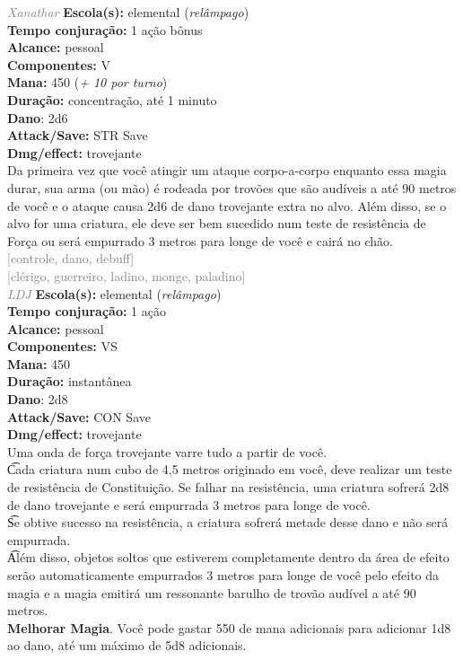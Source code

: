 \documentclass{RPG_Adventure}[2021/10/20]
\begin{document}
{\tiny \textcolor{gray}{\textit{Xanathar}}}
{\small \t \textbf{Escola(s):} elemental (\textit{relâmpago})\\\t \textbf{Tempo conjuração:} 1 ação bônus\\\t \textbf{Alcance:} pessoal\\\t \textbf{Componentes:} V\\\t \textbf{Mana:} 450 (\textit{+ 10 por turno})\\\t \textbf{Duração:} concentração, até 1 minuto\\\t \textbf{Dano}: 2d6\\\t \textbf{Attack/Save:} STR Save\\\t \textbf{Dmg/effect:} trovejante\\}
{\normalsize Da primeira vez que você atingir um ataque corpo-a-corpo enquanto essa magia durar, sua arma (ou mão) é rodeada por trovões que são audíveis a até 90 metros de você e o ataque causa 2d6 de dano trovejante extra no alvo. Além disso, se o alvo for uma criatura, ele deve ser bem sucedido num teste de resistência de Força ou será empurrado 3 metros para longe de você e cairá no chão.\\}
{\scriptsize \textcolor{gray}{[controle, dano, debuff]\\}}
{\scriptsize \textcolor{gray}{[clérigo, guerreiro, ladino, monge, paladino]\\}}
{\tiny \textcolor{gray}{\textit{LDJ}}}
{\small \t \textbf{Escola(s):} elemental (\textit{relâmpago})\\\t \textbf{Tempo conjuração:} 1 ação\\\t \textbf{Alcance:} pessoal\\\t \textbf{Componentes:} VS\\\t \textbf{Mana:} 450\\\t \textbf{Duração:} instantânea\\\t \textbf{Dano}: 2d8\\\t \textbf{Attack/Save:} CON Save\\\t \textbf{Dmg/effect:} trovejante\\}
{\normalsize Uma onda de força trovejante varre tudo a partir de você.\\\t Cada criatura num cubo de 4,5 metros originado em você, deve realizar um teste de resistência de Constituição. Se falhar na resistência, uma criatura sofrerá 2d8 de dano trovejante e será empurrada 3 metros para longe de você.\\\t Se obtive sucesso na resistência, a criatura sofrerá metade desse dano e não será empurrada.\\\t Além disso, objetos soltos que estiverem completamente dentro da área de efeito serão automaticamente empurrados 3 metros para longe de você pelo efeito da magia e a magia emitirá um ressonante barulho de trovão audível a até 90 metros.\\\t \textbf{Melhorar Magia}. Você pode gastar 550 de mana adicionais para adicionar 1d8 ao dano, até um máximo de 5d8 adicionais.\\}
\end{document}
